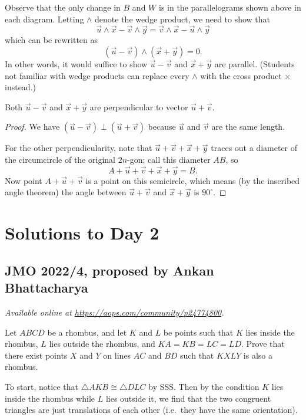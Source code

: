 \documentclass[11pt]{scrartcl}
\begin{document}
Observe that the only change in $B$ and $W$
is in the parallelograms shown above in each diagram.
Letting $\wedge$ denote the wedge product,
we need to show that
\[ \vec u \wedge \vec x - \vec v \wedge \vec y
  = \vec v \wedge \vec x - \vec u \wedge \vec y \]
which can be rewritten as
\[ (\vec u - \vec v) \wedge (\vec x + \vec y) = 0. \]
In other words, it would suffice to show
$\vec u - \vec v$ and $\vec x + \vec y$ are parallel.
(Students not familiar with wedge products can replace
every $\wedge$ with the cross product $\times$ instead.)
\begin{claim*}
  Both $\vec u - \vec v$ and $\vec x + \vec y$
  are perpendicular to vector $\vec u + \vec v$.
\end{claim*}
\begin{proof}
  We have $(\vec u - \vec v) \perp (\vec u + \vec v)$
  because $\vec u$ and $\vec v$ are the same length.

  For the other perpendicularity, note that
  $\vec u + \vec v + \vec x + \vec y$
  traces out a diameter of the circumcircle of the original $2n$-gon;
  call this diameter $AB$, so
  \[ A + \vec u + \vec v + \vec x + \vec y = B. \]
  Now point $A + \vec u + \vec v$ is a point on this semicircle,
  which means (by the inscribed angle theorem)
  the angle between $\vec u + \vec v$ and $\vec x + \vec y$ is $90^\circ$.
\end{proof}
\pagebreak

\section{Solutions to Day 2}
\subsection{JMO 2022/4, proposed by Ankan Bhattacharya}
\textsl{Available online at \url{https://aops.com/community/p24774800}.}
\begin{mdframed}[style=mdpurplebox,frametitle={Problem statement}]
Let $ABCD$ be a rhombus, and let $K$ and $L$ be points
such that $K$ lies inside the rhombus, $L$ lies outside the rhombus,
and $KA = KB = LC = LD$.
Prove that there exist points $X$ and $Y$ on lines $AC$ and $BD$
such that $KXLY$ is also a rhombus.
\end{mdframed}
To start, notice that $\triangle AKB \cong \triangle DLC$ by SSS.
Then by the condition $K$ lies inside the rhombus while $L$ lies outside it,
we find that the two congruent triangles are just translations of each other
(i.e.\ they have the same orientation).
\end{document}
